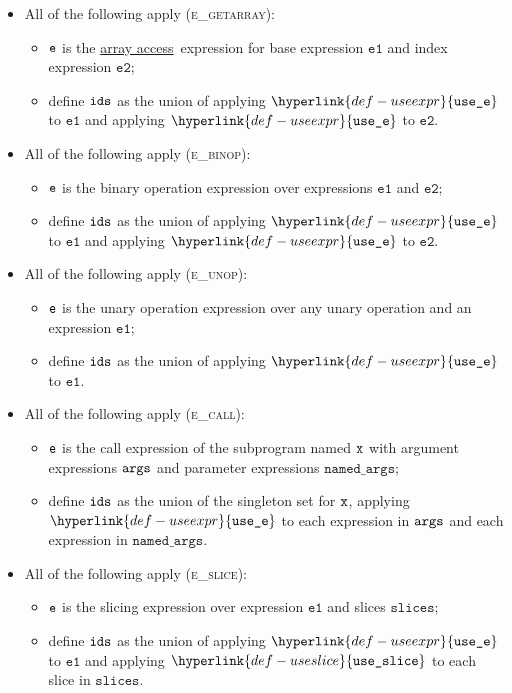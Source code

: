 \documentclass{book}
\newcommand\useexpr[0]{\hyperlink{def-useexpr}{\texttt{use\_e}}}
\newcommand\useslice[0]{\hyperlink{def-useslice}{\texttt{use\_slice}}}
\newcommand\arrayaccess[0]{\hyperlink{def-arrayaccess}{array access}}
\newcommand\veone[0]{\texttt{e1}}
\newcommand\vetwo[0]{\texttt{e2}}
\newcommand\slices[0]{\texttt{slices}}
\newcommand\namedargs[0]{\texttt{named\_args}}
\begin{document}
\begin{itemize}
  \item All of the following apply (\textsc{e\_getarray}):
  \begin{itemize}
    \item $\texttt{e}$ is the \arrayaccess\ expression for base expression $\veone$ and index expression $\vetwo$;
    \item define $\texttt{ids}$ as the union of applying $\useexpr$ to $\veone$ and applying $\useexpr$ to $\vetwo$.
  \end{itemize}

  \item All of the following apply (\textsc{e\_binop}):
  \begin{itemize}
    \item $\texttt{e}$ is the binary operation expression over expressions $\veone$ and $\vetwo$;
    \item define $\texttt{ids}$ as the union of applying $\useexpr$ to $\veone$ and applying $\useexpr$ to $\vetwo$.
  \end{itemize}

  \item All of the following apply (\textsc{e\_unop}):
  \begin{itemize}
    \item $\texttt{e}$ is the unary operation expression over any unary operation and an expression $\veone$;
    \item define $\texttt{ids}$ as the union of applying $\useexpr$ to $\veone$.
  \end{itemize}

  \item All of the following apply (\textsc{e\_call}):
  \begin{itemize}
    \item $\texttt{e}$ is the call expression of the subprogram named $\texttt{x}$ with argument expressions $\texttt{args}$ and parameter expressions $\namedargs$;
    \item define $\texttt{ids}$ as the union of the singleton set for $\texttt{x}$, applying $\useexpr$ to each expression in $\texttt{args}$ and each expression
          in $\namedargs$.
  \end{itemize}

  \item All of the following apply (\textsc{e\_slice}):
  \begin{itemize}
    \item $\texttt{e}$ is the slicing expression over expression $\veone$ and slices $\slices$;
    \item define $\texttt{ids}$ as the union of applying $\useexpr$ to $\veone$ and applying $\useslice$ to each slice in $\slices$.
  \end{itemize}


\end{itemize}
\end{document}
